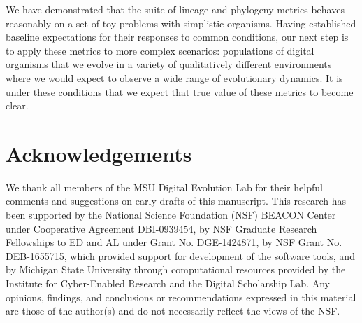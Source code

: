 \documentclass[letterpaper]{article}
\begin{document}
We have demonstrated that the suite of lineage and phylogeny metrics behaves reasonably on a set of toy problems with simplistic organisms. Having established baseline expectations for their responses to common conditions, our next step is to apply these metrics to more complex scenarios: populations of digital organisms that we evolve in a variety of qualitatively different environments where we would expect to observe a wide range of evolutionary dynamics. It is under these conditions that we expect that true value of these metrics to become clear.

\section{Acknowledgements}




We thank all members of the MSU Digital Evolution Lab for their helpful comments and suggestions on early drafts of this manuscript. This research has been supported by the National Science Foundation (NSF) BEACON Center under Cooperative Agreement DBI-0939454, by NSF Graduate Research Fellowships to ED and AL under Grant No. DGE-1424871, by NSF Grant No. DEB-1655715, which provided support for development of the software tools, and by Michigan State University through computational resources provided by the Institute for Cyber-Enabled Research and the Digital Scholarship Lab. Any opinions, findings, and conclusions or recommendations expressed in this material are those of the author(s) and do not necessarily reflect the views of the NSF.

\setlength{\bibsep}{2pt}

\footnotesize

\end{document}
